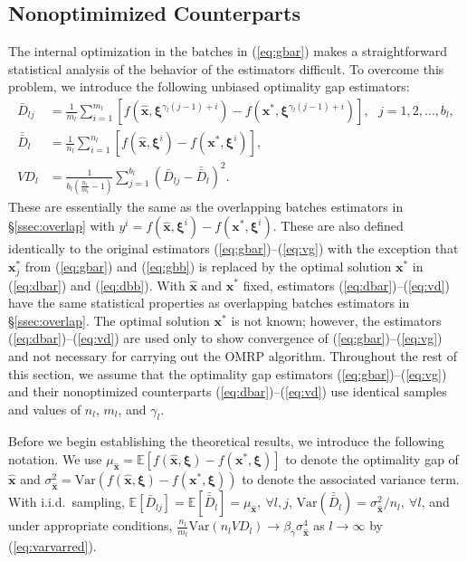 \documentclass[12pt]{article}
\newcommand{\e}[1]{\mathbb{E} \left[ #1 \right]
}
\newcommand{\var}[1]{\mathrm{Var} \left( #1 \right)}
\newcommand{\x}{\mathbf{x}}
\newcommand{\xh}{{\hat{\x}}}
\newcommand{\xs}{\x^*}
\newcommand{\xit}{\boldsymbol{\xi}}
\newcommand{\xiti}{\xit^i}
\newcommand{\nbl}{b_l}
\newcommand{\gammab}{\bar{\gamma}}
\newcommand{\db}{\bar{D}}
\newcommand{\dbb}{\bar{\db}}
\begin{document}
\subsection{Nonoptimimized Counterparts}
\label{subsec:nonO}

The internal optimization in the batches in (\ref{eq:gbar}) makes a straightforward statistical analysis of the behavior of the estimators difficult.  
To overcome this problem, we introduce the following unbiased optimality gap estimators:
\begin{align}
	\db_{lj} & = \frac{1}{m_l} \sum_{i=1}^{m_l} \left[ f(\xh,\xit^{\gamma_l(j-1)+i}) - f(\xs,\xit^{\gamma_l(j-1)+i}) \right],\ \ \ j = 1, 2, \dots, \nbl, \label{eq:dbar} \\
	\dbb_l & = \frac{1}{n_l} \sum_{i=1}^{n_l} \left[ f(\xh,\xiti) - f(\xs,\xiti) \right], \label{eq:dbb} \\
	VD_l & = \frac{1}{\nbl \left( \tfrac{n_l}{m_l} - 1 \right)} \sum_{j=1}^{\nbl} (\db_{lj} - \dbb_l)^2. \label{eq:vd}
\end{align}
These are essentially the same as the overlapping batches estimators in \S \ref{ssec:overlap} with $y^i = f(\xh,\xiti) - f(\xs,\xiti)$.  
These are also defined identically to the original estimators (\ref{eq:gbar})--(\ref{eq:vg}) with the exception that $\xs_j$ from (\ref{eq:gbar}) and (\ref{eq:gbb}) is replaced by the optimal solution $\xs$ in (\ref{eq:dbar}) and (\ref{eq:dbb}).  
With $\xh$ and $\xs$ fixed, estimators (\ref{eq:dbar})--(\ref{eq:vd}) have the same statistical properties as overlapping batches estimators in \S \ref{ssec:overlap}.  
The optimal solution $\xs$ is not known; however, the estimators (\ref{eq:dbar})--(\ref{eq:vd}) are used only to show convergence of (\ref{eq:gbar})--(\ref{eq:vg}) and not necessary for carrying out the OMRP algorithm.  
Throughout the rest of this section, we assume that the optimality gap estimators (\ref{eq:gbar})--(\ref{eq:vg}) and their nonoptimized counterparts (\ref{eq:dbar})--(\ref{eq:vd}) use identical samples and values of $n_
l$, $m_l$, and $\gamma_l$.  \smallskip 

Before we begin establishing the theoretical results, we introduce the following notation. 
We use $\mu_{\xh} = \e{f(\xh,\xit) - f(\xs,\xit)}$ to denote the optimality gap of $\xh$ and $\sigma^2_{\xh} = \var{f(\xh,\xit) - f(\xs,\xit)}$ to denote the associated variance term.
With i.i.d.\ sampling, $\e{\db_{lj}}=\e{\dbb_l}=\mu_{\xh}, \ \forall l,j$, $\mathrm{Var}(\dbb_l)=\sigma^2_{\xh}/n_l, \ \forall l$, and under appropriate conditions, $\frac{n_l}{m_l} \var{n_l VD_l} \rightarrow \beta_{\gammab} \sigma^4_{\xh}$ as $l \rightarrow \infty$  by (\ref{eq:varvarred}). 
\end{document}
